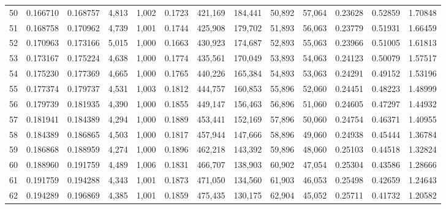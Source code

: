 \begin{tabular}{rrrrrrrrrrrrr}
50  &  0.166710 &  0.168757 &   4,813 &  1,002 &                                     0.1723 &  421,169 &  184,441 &   50,892 &   57,064 &  0.23628 &  0.52859 &  1.70848 \\
51  &  0.168758 &  0.170962 &   4,739 &  1,001 &                                     0.1744 &  425,908 &  179,702 &   51,893 &   56,063 &  0.23779 &  0.51931 &  1.66459 \\
52  &  0.170963 &  0.173166 &   5,015 &  1,000 &                                     0.1663 &  430,923 &  174,687 &   52,893 &   55,063 &  0.23966 &  0.51005 &  1.61813 \\
53  &  0.173167 &  0.175224 &   4,638 &  1,000 &                                     0.1774 &  435,561 &  170,049 &   53,893 &   54,063 &  0.24123 &  0.50079 &  1.57517 \\
54  &  0.175230 &  0.177369 &   4,665 &  1,000 &                                     0.1765 &  440,226 &  165,384 &   54,893 &   53,063 &  0.24291 &  0.49152 &  1.53196 \\
55  &  0.177374 &  0.179737 &   4,531 &  1,003 &                                     0.1812 &  444,757 &  160,853 &   55,896 &   52,060 &  0.24451 &  0.48223 &  1.48999 \\
56  &  0.179739 &  0.181935 &   4,390 &  1,000 &                                     0.1855 &  449,147 &  156,463 &   56,896 &   51,060 &  0.24605 &  0.47297 &  1.44932 \\
57  &  0.181941 &  0.184389 &   4,294 &  1,000 &                                     0.1889 &  453,441 &  152,169 &   57,896 &   50,060 &  0.24754 &  0.46371 &  1.40955 \\
58  &  0.184389 &  0.186865 &   4,503 &  1,000 &                                     0.1817 &  457,944 &  147,666 &   58,896 &   49,060 &  0.24938 &  0.45444 &  1.36784 \\
59  &  0.186868 &  0.188959 &   4,274 &  1,000 &                                     0.1896 &  462,218 &  143,392 &   59,896 &   48,060 &  0.25103 &  0.44518 &  1.32824 \\
60  &  0.188960 &  0.191759 &   4,489 &  1,006 &                                     0.1831 &  466,707 &  138,903 &   60,902 &   47,054 &  0.25304 &  0.43586 &  1.28666 \\
61  &  0.191759 &  0.194288 &   4,343 &  1,001 &                                     0.1873 &  471,050 &  134,560 &   61,903 &   46,053 &  0.25498 &  0.42659 &  1.24643 \\
62  &  0.194289 &  0.196869 &   4,385 &  1,001 &                                     0.1859 &  475,435 &  130,175 &   62,904 &   45,052 &  0.25711 &  0.41732 &  1.20582 \\

\end{tabular}
